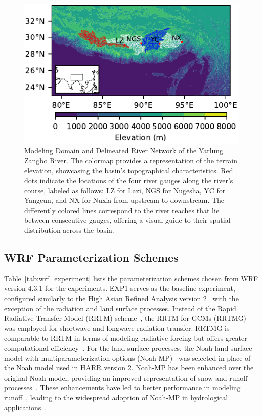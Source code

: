 \documentclass[draft]{agujournal2019}
\begin{document}
\begin{figure}[h!]
  \centering
  \noindent\includegraphics[width=140mm]{domain.pdf}
  \caption{Modeling Domain and Delineated River Network of the Yarlung Zangbo River. The colormap provides a representation of the terrain elevation, showcasing the basin's topographical characteristics. Red dots indicate the locations of the four river gauges along the river's course, labeled as follows: LZ for Lazi, NGS for Nugesha, YC for Yangcun, and NX for Nuxia from upstream to downstream. The differently colored lines correspond to the river reaches that lie between consecutive gauges, offering a visual guide to their spatial distribution across the basin.}
  \label{fig:domain}
\end{figure}

\subsection{WRF Parameterization Schemes}
\label{sec:wrf}

Table~\ref{tab:wrf_experiment} lists the parameterization schemes chosen from WRF version 4.3.1 for the experiments. EXP1 serves as the baseline experiment, configured similarly to the High Asian Refined Analysis version 2~\cite{wang2021IJC} with the exception of the radiation and land surface processes. Instead of the Rapid Radiative Transfer Model (RRTM) scheme~\cite{mlawer1997JGRA}, the RRTM for GCMs (RRTMG)~\cite{iacono2008JGRA} was employed for shortwave and longwave radiation transfer. RRTMG is comparable to RRTM in terms of modeling radiative forcing but offers greater computational efficiency~\cite{iacono2008JGRA}. For the land surface processes, the Noah land surface model with multiparameterization options (Noah-MP)~\cite{niu2011JGRA,yang2011JGRA} was selected in place of the Noah model used in HARR version 2. Noah-MP has been enhanced over the original Noah model, providing an improved representation of snow and runoff processes~\cite{niu2011JGRA}. These enhancements have led to better performance in modeling runoff~\cite{liang2019AAS, zheng2023ESSD}, leading to the widespread adoption of Noah-MP in hydrological applications~\cite{cosgrove2024JAWRA, lin2018JHM}.
\end{document}
